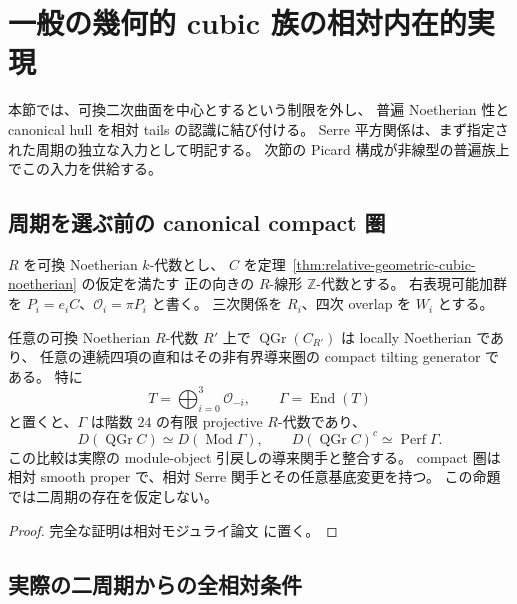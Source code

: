 \section{一般の幾何的 cubic 族の相対内在的実現}
\label{sec:relative-cubic-families}

本節では、可換二次曲面を中心とするという制限を外し、
普遍 Noetherian 性と canonical hull を相対 tails の認識に結び付ける。
Serre 平方関係は、まず指定された周期の独立な入力として明記する。
次節の Picard 構成が非線型の普遍族上でこの入力を供給する。

\subsection{周期を選ぶ前の canonical compact 圏}

$R$ を可換 Noetherian $k$-代数とし、
$C$ を定理~\ref{thm:relative-geometric-cubic-noetherian} の仮定を満たす
正の向きの $R$-線形 $\mathbb Z$-代数とする。
右表現可能加群を $P_i=e_iC$、$\mathcal O_i=\pi P_i$ と書く。
三次関係を $R_i$、四次 overlap を $W_i$ とする。

\begin{proposition}
\label{prop:general-cubic-canonical-tails}
任意の可換 Noetherian $R$-代数 $R'$ 上で
$\operatorname{QGr}(C_{R'})$ は locally Noetherian であり、
任意の連続四項の直和はその非有界導来圏の compact tilting generator である。
特に
\[
 T=\bigoplus_{i=0}^3\mathcal O_{-i},\qquad
 \Gamma=\operatorname{End}(T)
\]
と置くと、$\Gamma$ は階数 $24$ の有限 projective $R$-代数であり、
\[
 D(\operatorname{QGr}C)\simeq D(\operatorname{Mod}\Gamma),\qquad
 D(\operatorname{QGr}C)^c\simeq\operatorname{Perf}\Gamma.
 \tag{GC-Morita}\label{eq:general-cubic-canonical-morita}
\]
この比較は実際の module-object 引戻しの導来関手と整合する。
compact 圏は相対 smooth proper で、相対 Serre 関手とその任意基底変更を持つ。
この命題では二周期の存在を仮定しない。
\end{proposition}

\begin{proof}
完全な証明は相対モジュライ論文 \cite[\texttt{relative_cubic_families}]{QuadricModuli2026} に置く。
\end{proof}

\subsection{実際の二周期からの全相対条件}

